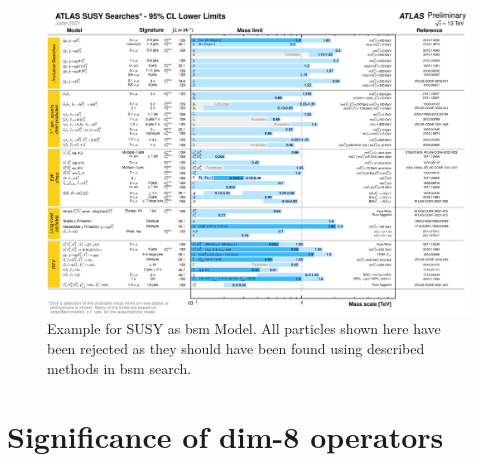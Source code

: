 \documentclass[../Bachelorarbeit.tex]{subfiles}
\begin{document}
\captionsetup[figure]{list=no}
\begin{figure}
    \centering
    \includegraphics[width=\textwidth]{images/fig_23_ATLAS_SUSY.png}
    \caption{Example for SUSY as \acrshort{bsm} Model. All particles shown here have been rejected as they should have been found using described methods in \acrshort{bsm} search.  \cite{.07.06.2021}}
    \label{fig:ATLAS_SUSY}
\end{figure}

\section{Significance of dim-8 operators}
\label{sec:signif_dim8}
\end{document}

